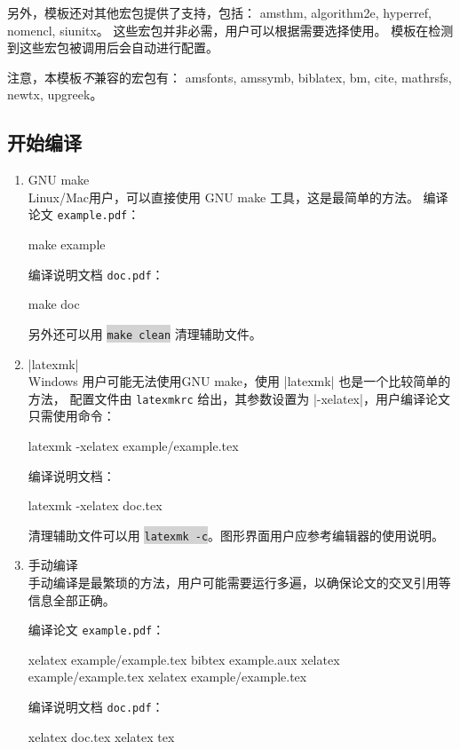 \documentclass[a4paper]{ltxdoc}
\DeclareRobustCommand\file{\nolinkurl}
\DeclareRobustCommand\pkg{\textsf}
\newcommand\shellcmd[1]{\colorbox{lightgray}{\lstinline[style=lstshell]|#1|}}
\begin{document}
另外，模板还对其他宏包提供了支持，包括：
\pkg{amsthm},
\pkg{algorithm2e},
\pkg{hyperref},
\pkg{nomencl},
\pkg{siunitx}。
这些宏包并非必需，用户可以根据需要选择使用。
模板在检测到这些宏包被调用后会自动进行配置。

注意，本模板\emph{不}兼容的宏包有：
\pkg{amsfonts},
\pkg{amssymb},
\pkg{biblatex},
\pkg{bm},
\pkg{cite},
\pkg{mathrsfs},
\pkg{newtx},
\pkg{upgreek}。


\subsection{开始编译}

\begin{enumerate}

\item GNU make \\
Linux/Mac用户，可以直接使用 GNU make 工具，这是最简单的方法。
编译论文 \file{example.pdf}：
\begin{shell}
  make example
\end{shell}
编译说明文档 \file{doc.pdf}：
\begin{shell}
  make doc
\end{shell}
另外还可以用 \shellcmd{make clean} 清理辅助文件。

\item |latexmk| \\
Windows 用户可能无法使用GNU make，使用 |latexmk| 也是一个比较简单的方法，
配置文件由 \file{latexmkrc} 给出，其参数设置为 |-xelatex|，用户编译论文
只需使用命令：
\begin{shell}
  latexmk -xelatex example/example.tex
\end{shell}
编译说明文档：
\begin{shell}
  latexmk -xelatex doc.tex
\end{shell}
清理辅助文件可以用 \shellcmd{latexmk -c}。图形界面用户应参考编辑器的使用说明。

\item 手动编译 \\
手动编译是最繁琐的方法，用户可能需要运行多遍，以确保论文的交叉引用等信息全部正确。

编译论文 \file{example.pdf}：
\begin{shell}
  xelatex example/example.tex
  bibtex example.aux
  xelatex example/example.tex
  xelatex example/example.tex
\end{shell}
编译说明文档 \file{doc.pdf}：
\begin{shell}
  xelatex doc.tex
  xelatex tex
\end{shell}
\end{enumerate}
\end{document}
